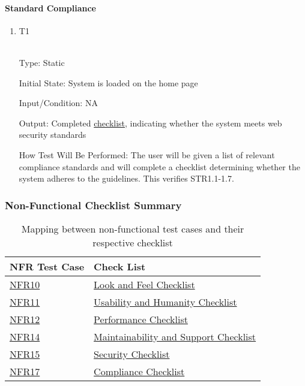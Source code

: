 \documentclass[12pt, titlepage]{article}
\begin{document}
\paragraph{Standard Compliance}
\begin{enumerate}
\item {T1\\}\\
\hypertarget{NFR17.2-TC1}{}

Type: Static

Initial State: System is loaded on the home page

Input/Condition: NA

Output: Completed \hyperlink{checlist-nfr17}{checklist}, indicating whether the system meets web security standards

How Test Will Be Performed: The user will be given a list of relevant compliance standards and will complete a checklist determining whether the system adheres to the guidelines. This verifies STR1.1-1.7.
\end{enumerate}

\subsubsection{Non-Functional Checklist Summary}

\begin{table}[h!]
\begin{tabularx}{\textwidth}{p{5cm}p{5cm}}
\toprule {\bf NFR Test Case} & {\bf Check List}\\
\midrule 

  \hyperlink{nfr10}{NFR10} & \hyperlink{checklist-nfr10}{Look and Feel Checklist}\\
  \hyperlink{nfr11}{NFR11} & \hyperlink{checklist-nfr11}{Usability and Humanity Checklist}\\
  \hyperlink{nfr12}{NFR12} & \hyperlink{checklist-nfr12}{Performance Checklist}\\
  \hyperlink{nfr14}{NFR14} & \hyperlink{checklist-nfr14}{Maintainability and Support Checklist}\\
  \hyperlink{nfr15}{NFR15} & \hyperlink{checklist-nfr15}{Security Checklist}\\
  \hyperlink{nfr17}{NFR17} & \hyperlink{checklist-nfr17}{Compliance Checklist}\\

\bottomrule
\end{tabularx}
\caption{Mapping between non-functional test cases and their respective checklist}
\end{table}
\end{document}
